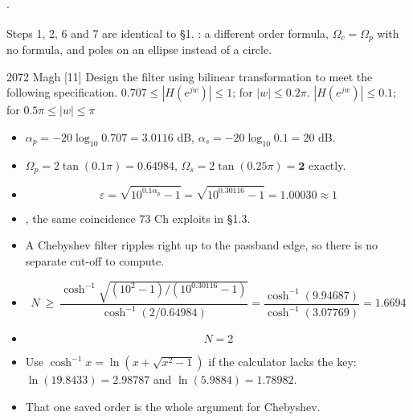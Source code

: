 \hr

{\color{sub}\footnotesize {}  \gap$\cdot$\gap {}}

{\color{sub}\footnotesize Steps 1, 2, 6 and 7 are identical to \S1. : a different order formula, $\Omega_c=\Omega_p$ with no formula, and poles
on an ellipse instead of a circle.}

\begin{asked}{2072 Magh \textperiodcentered{} [11]}
Design the  filter using bilinear transformation to meet the following
specification. $0.707\le|H(e^{jw})|\le1$; for $|w|\le0.2\pi$. $|H(e^{jw})|\le0.1$; for
$0.5\pi\le|w|\le\pi$
\end{asked}

\begin{itemize}
  \item $\alpha_p=-20\log_{10}0.707=3.0116$ dB, $\alpha_s=-20\log_{10}0.1=20$ dB.
  \item $\Omega_p=2\tan(0.1\pi)=\mathbf{0.64984}$,
        $\Omega_s=2\tan(0.25\pi)=\mathbf{2}$ exactly.
  \item[] \[ \varepsilon=\sqrt{10^{0.1\alpha_p}-1}=\sqrt{10^{0.30116}-1}
             =\mathbf{1.00030}\approx1 \]
  \item {}, the same coincidence
        73 Ch exploits in \S1.3.
  \item {} A Chebyshev filter ripples right up to the
        passband edge, so there is no separate cut-off to compute.
\end{itemize}

\begin{itemize}
  \item[] \[ N\ \ge\ \frac{\cosh^{-1}\sqrt{(10^{2}-1)/(10^{0.30116}-1)}}
                          {\cosh^{-1}(2/0.64984)}
             =\frac{\cosh^{-1}(9.94687)}{\cosh^{-1}(3.07769)}=1.6694 \]
  \item[] \[ \boxed{N=2} \]
  \item Use $\cosh^{-1}x=\ln\!\left(x+\sqrt{x^2-1}\right)$ if the calculator lacks the
        key: $\ln(19.8433)=2.98787$ and $\ln(5.9884)=1.78982$.
  \item {} That one
        saved order is the whole argument for Chebyshev.
\end{itemize}

